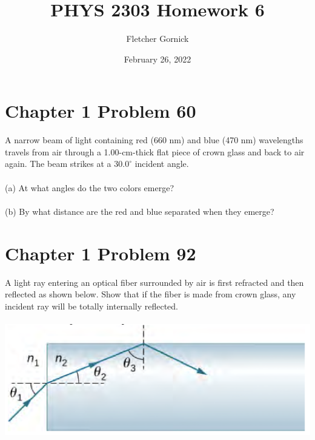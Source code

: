 \documentclass[11pt]{article}
\title{\vspace{-1.0cm}PHYS 2303 Homework 6}
\author{Fletcher Gornick}
\date{February 26, 2022}
\begin{document}
 \maketitle
 \section*{Chapter 1 Problem 60}
 A narrow beam of light containing red (660 nm) and blue (470 nm) wavelengths travels from air 
 through a 1.00-cm-thick flat piece of crown glass and back to air again. The beam strikes at a 
 \(30.0^\circ\) incident angle. \\\\
 (a) At what angles do the two colors emerge? \\\\
 (b) By what distance are the red and blue separated when they emerge?
 \newpage

 \section*{Chapter 1 Problem 92}
 A light ray entering an optical fiber surrounded by air is first refracted and then reflected 
 as shown below. Show that if the fiber is made from crown glass, any incident ray will be totally 
 internally reflected. \\\\
 \includegraphics[scale=0.5]{1-92.png}
 \newpage
\end{document}
